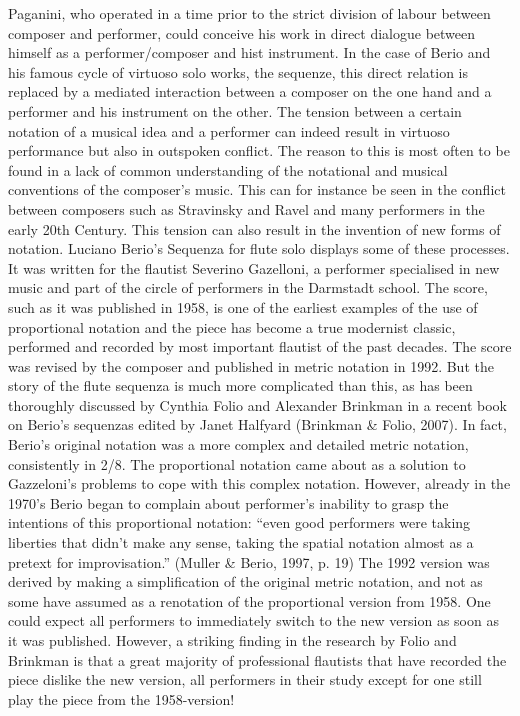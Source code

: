 Paganini, who operated in a time prior to the strict division of
labour between composer and performer, could conceive his work in
direct dialogue between himself as a performer/composer and hist
instrument. In the case of Berio and his famous cycle of virtuoso solo
works, the sequenze, this direct relation is replaced by a mediated
interaction between a composer on the one hand and a performer and his
instrument on the other. The tension between a certain notation of a
musical idea and a performer can indeed result in virtuoso performance
but also in outspoken conflict. The reason to this is most often to be
found in a lack of common understanding of the notational and musical
conventions of the composer's music. This can for instance be seen in
the conflict between composers such as Stravinsky and Ravel and many
performers in the early 20th Century. This tension can also result in
the invention of new forms of notation. Luciano Berio's Sequenza for
flute solo displays some of these processes. It was written for the
flautist Severino Gazelloni, a performer specialised in new music and
part of the circle of performers in the Darmstadt school. The score,
such as it was published in 1958, is one of the earliest examples of
the use of proportional notation and the piece has become a true
modernist classic, performed and recorded by most important flautist
of the past decades. The score was revised by the composer and
published in metric notation in 1992. But the story of the flute
sequenza is much more complicated than this, as has been thoroughly
discussed by Cynthia Folio and Alexander Brinkman in a recent book on
Berio's sequenzas edited by Janet Halfyard (Brinkman \& Folio,
2007). In fact, Berio's original notation was a more complex and
detailed metric notation, consistently in 2/8. The proportional
notation came about as a solution to Gazzeloni's problems to cope with
this complex notation. However, already in the 1970's Berio began to
complain about performer's inability to grasp the intentions of this
proportional notation: ``even good performers were taking liberties
that didn't make any sense, taking the spatial notation almost as a
pretext for improvisation.'' (Muller \& Berio, 1997, p. 19) The 1992
version was derived by making a simplification of the original metric
notation, and not as some have assumed as a renotation of the
proportional version from 1958.  One could expect all performers to
immediately switch to the new version as soon as it was
published. However, a striking finding in the research by Folio and
Brinkman is that a great majority of professional flautists that have
recorded the piece dislike the new version, all performers in their
study except for one still play the piece from the 1958-version!
 
